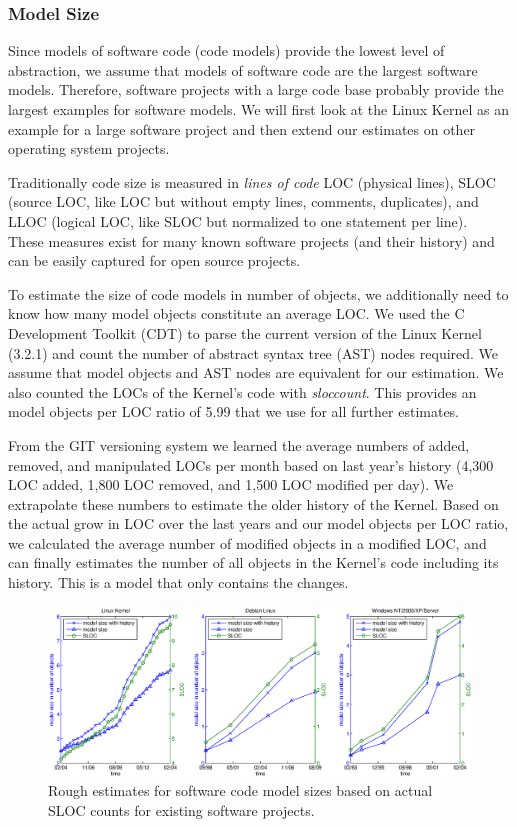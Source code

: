 \subsubsection*{Model Size}

Since models of software code (code models) provide the lowest level of abstraction, we assume that models of software code are the largest software models. Therefore, software projects with a large code base probably provide the largest examples for software models. We will first look at the Linux Kernel as an example for a large software project and then extend our estimates on other operating system projects.

Traditionally code size is measured in \emph{lines of code} LOC (physical lines), SLOC (source LOC, like LOC but without empty lines, comments, duplicates), and LLOC (logical LOC, like SLOC but normalized to one statement per line).~\cite{wheeler} 
These measures exist for many known software projects (and their history) and can be easily captured for open source projects. 

To estimate the size of code models in number of objects, we additionally need to know how many model objects constitute an average LOC. We used the C Development Toolkit (CDT) to parse the current version of the Linux Kernel (3.2.1) and count the number of abstract syntax tree (AST) nodes required. We assume that model objects and AST nodes are equivalent for our estimation. We also counted the LOCs of the Kernel's code with \emph{sloccount}. This provides an model objects per LOC ratio of 5.99 that we use for all further estimates.

From the GIT versioning system we learned the average numbers of added, removed, and manipulated LOCs per month based on last year's history (4,300 LOC added, 1,800 LOC removed, and 1,500 LOC modified per day). We extrapolate these numbers to estimate the older history of the Kernel. Based on the actual grow in LOC over the last years and our model objects per LOC ratio, we calculated the average number of modified objects in a modified LOC, and can finally estimates the number of all objects in the Kernel's code including its history. This is a model that only contains the changes.

\begin{figure}
  \centering
  \includegraphics[width=\linewidth]{figures/software_model_sizes}
  \caption{Rough estimates for software code model sizes based on actual SLOC counts for existing software projects.}
  \label{fig:software_model_sizes}
\end{figure}


